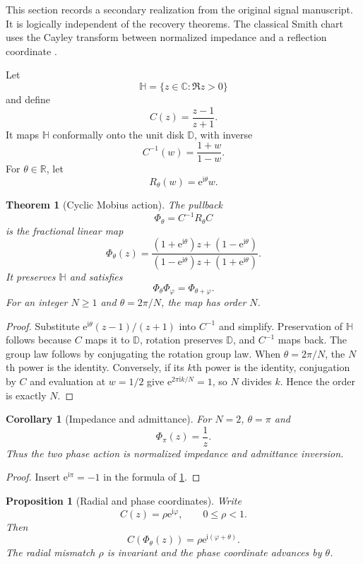\documentclass{aomart}
\newtheorem{theorem}{Theorem}[section]
\newtheorem{proposition}[proposition]{Proposition}
\newtheorem{corollary}[corollary]{Corollary}
\theoremstyle{definition}
\theoremstyle{remark}
\newcommand{\CC}{\mathbb C}
\newcommand{\RR}{\mathbb R}
\newcommand{\e}{\mathrm e}
\newcommand{\ii}{\mathrm i}
\begin{document}
This section records a secondary realization from the original signal manuscript. It is logically independent of the recovery theorems. The classical Smith chart uses the Cayley transform between normalized impedance and a reflection coordinate \cite{Smith1969}.

Let
\[
\mathbb H
=
\{z\in\CC:\Re z>0\}
\]
and define
\[
C(z)=\frac{z-1}{z+1}.
\]
It maps \(\mathbb H\) conformally onto the unit disk \(\mathbb D\), with inverse
\[
C^{-1}(w)=\frac{1+w}{1-w}.
\]
For \(\theta\in\RR\), let
\[
R_\theta(w)=\e^{\ii\theta}w.
\]

\begin{theorem}[Cyclic Mobius action]\label{thm:cyclic_mobius}
The pullback
\[
\Phi_\theta
=C^{-1}R_\theta C
\]
is the fractional linear map
\[
\boxed{
\Phi_\theta(z)
=
\frac{(1+\e^{\ii\theta})z+(1-\e^{\ii\theta})}
{(1-\e^{\ii\theta})z+(1+\e^{\ii\theta})}.
}
\]
It preserves \(\mathbb H\) and satisfies
\[
\Phi_\theta\Phi_\varphi
=
\Phi_{\theta+\varphi}.
\]
For an integer \(N\geq1\) and \(\theta=2\pi/N\), the map has order \(N\).
\end{theorem}

\begin{proof}
Substitute \(\e^{\ii\theta}(z-1)/(z+1)\) into \(C^{-1}\) and simplify. Preservation of \(\mathbb H\) follows because \(C\) maps it to \(\mathbb D\), rotation preserves \(\mathbb D\), and \(C^{-1}\) maps back. The group law follows by conjugating the rotation group law. When \(\theta=2\pi/N\), the \(N\)th power is the identity. Conversely, if its \(k\)th power is the identity, conjugation by \(C\) and evaluation at \(w=1/2\) give \(\e^{2\pi\ii k/N}=1\), so \(N\) divides \(k\). Hence the order is exactly \(N\).
\end{proof}

\begin{corollary}[Impedance and admittance]\label{cor:impedance_admittance}
For \(N=2\), \(\theta=\pi\) and
\[
\Phi_\pi(z)=\frac1z.
\]
Thus the two phase action is normalized impedance and admittance inversion.
\end{corollary}

\begin{proof}
Insert \(\e^{\ii\pi}=-1\) in the formula of \cref{thm:cyclic_mobius}.
\end{proof}

\begin{proposition}[Radial and phase coordinates]\label{prop:radial_phase}
Write
\[
C(z)=\rho\e^{\ii\varphi},
\qquad
0\leq\rho<1.
\]
Then
\[
C(\Phi_\theta(z))
=
\rho\e^{\ii(\varphi+\theta)}.
\]
The radial mismatch \(\rho\) is invariant and the phase coordinate advances by \(\theta\).
\end{proposition}
\end{document}
